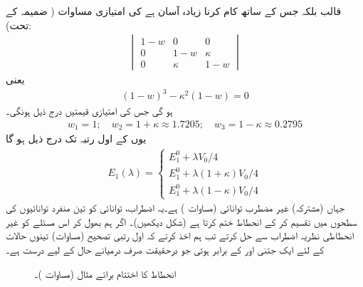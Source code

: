 قالب  بلکہ  جس کے ساتھ کام کرنا زیادہ آسان ہے کی امتیازی مساوات ( ضمیمہ  کے تحت):
\begin{align*}
\begin{vmatrix}
1 - w & 0 & 0 \\
0 & 1 - w& \kappa \\
0 & \kappa & 1 - w
\end{vmatrix}
\end{align*}
یعنی
\begin{align*}
(1 - w)^3 - \kappa^2 (1 - w) = 0
\end{align*}
ہو گی جس کی امتیازی قیمتیں درج ذیل ہونگی۔ 
\begin{align*}
w_1 = 1; \quad w_2 = 1+ \kappa \approx 1.7205; \quad w_3 = 1 - \kappa \approx 0.2795
\end{align*}
یوں  کے اول رتبہ تک درج ذیل ہو گا 
\begin{align}\label{مساوات_غیر_مضطرب_توانائی_کعبی_کنواں}
E_1 (\lambda) = 
\begin{cases}
E_1^0 + \lambda V_0/4 \\
E_1^0 + \lambda (1+ \kappa) V_0 /4 \\
E_1^0 + \lambda (1 - \kappa) V_0 /4
\end{cases}
\end{align}
جہاں  (مشترکہ) غیر مضطرب توانائی (مساوات ) ہے۔یہ اضطراب، توانائی  کو تین منفرد توانائیوں کی سطحوں میں تقسیم کر کے انحطاط ختم کرتا ہے (شکل  دیکھیں)۔ اگر ہم بھول کر اس مسئلے کو غیر انحطاطی نظریہ اضطراب سے حل کرتے تب ہم اخذ کرتے کہ اول رتبی تصحیح (مساوات) تینوں حالات کے لئے ایک جتنی اور  کے برابر ہوتی جو درحقیقت صرف درمیانے حال کے لیے درست ہے۔

\begin{figure}
\centering
{}
\caption{انحطاط کا اختتام برائے مثال  (مساوات )۔}
\label{شکل_غیر_تابع_اضطراب_انحطاط_اختتام_مثال}
\end{figure}


